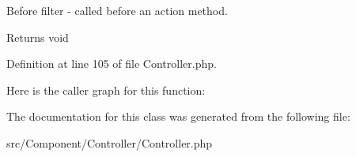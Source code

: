 Before filter -\/ called before an action method.

\begin{DoxyReturn}{Returns}
void 
\end{DoxyReturn}


Definition at line 105 of file Controller.\+php.

Here is the caller graph for this function\+:


The documentation for this class was generated from the following file\+:\begin{DoxyCompactItemize}
\item 
src/\+Component/\+Controller/Controller.\+php\end{DoxyCompactItemize}
